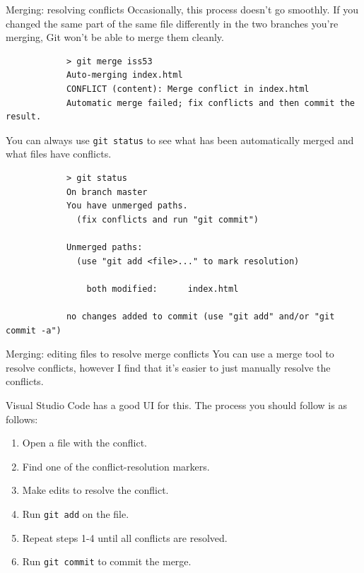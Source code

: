 \documentclass{beeper}
\begin{document}
\begin{frame}[fragile]{Merging: resolving conflicts}
    Occasionally, this process doesn't go smoothly. If you changed the same part
    of the same file differently in the two branches you're merging, Git won't
    be able to merge them cleanly.

    {
        \tiny
        \begin{verbatim}
            > git merge iss53
            Auto-merging index.html
            CONFLICT (content): Merge conflict in index.html
            Automatic merge failed; fix conflicts and then commit the result.
        \end{verbatim}
    }
    \pause
    You can always use \texttt{git status} to see what has been automatically
    merged and what files have conflicts.
    {
        \tiny
        \begin{verbatim}
            > git status
            On branch master
            You have unmerged paths.
              (fix conflicts and run "git commit")

            Unmerged paths:
              (use "git add <file>..." to mark resolution)

                both modified:      index.html

            no changes added to commit (use "git add" and/or "git commit -a")
        \end{verbatim}
    }
\end{frame}

\begin{frame}[fragile]{Merging: editing files to resolve merge conflicts}
    You can use a merge tool to resolve conflicts, however I find that it's
    easier to just manually resolve the conflicts.

    Visual Studio Code has a good UI for this. The process you should follow is
    as follows:

    \begin{enumerate}
        \item Open a file with the conflict.
        \item Find one of the conflict-resolution markers.
        \item Make edits to resolve the conflict.
        \item Run \texttt{git add} on the file.
        \item Repeat steps 1-4 until all conflicts are resolved.
        \item Run \texttt{git commit} to commit the merge.
    \end{enumerate}

\end{frame}
\end{document}

